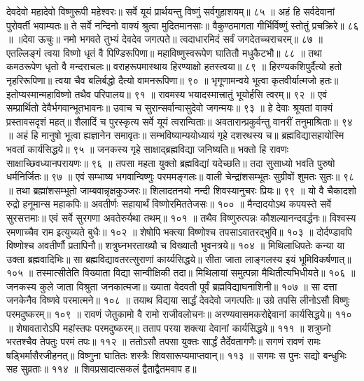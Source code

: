 देवदेवो महादेवो विष्णुरूपी महेश्वरः॥
सर्वे यूयं प्रार्थयन्तु विष्णुं सर्वगुहाशयम्॥ ८५ ॥
अहं हि सर्वदेवानां पुरोवर्ती भवाम्यतः॥
ते सर्वे नन्दिनो वाक्यं श्रुत्वा मुदितमानसाः॥
वैकुण्ठमागता गीर्भिर्विष्णुं स्तोतुं प्रचक्रिरे॥ ८६ ॥
॥देवा ऊचुः॥
नमो भगवते तुभ्यं देवदेव जगत्पते॥
त्वदाधारमिदं सर्वं जगदेतच्चराचरम्॥ ८७ ॥
एतल्लिङ्गं त्वया विष्णो धृतं वै पिण्डिरूपिणा॥
महाविष्णुस्वरूपेण घातितौ मधुकैटभौ॥ ८८ ॥
तथा कमठरूपेण धृतो वै मन्दराचलः॥
वराहरूपमास्थाय हिरण्याक्षो हतस्त्वया॥ ८९ ॥
हिरण्यकशिपुर्दैत्यो हतो नृहरिरूपिणा॥
त्वया चैव बलिर्बद्धो दैत्यो वामनरूपिणा॥ ९० ॥
भृगूणामन्वये भूत्वा कृतवीर्यात्मजो हतः॥
इतोप्यस्मान्महाविष्णो तथैव परिपालय॥ ९१ ॥
रावमस्य भयादस्मात्त्रातुं भूयोर्हसि त्वरम्॥ ९२ ॥
एवं सम्प्रार्थितो देवैर्भगवान्भूतभावनः॥
उवाच च सुरान्सर्वान्वासुदेवो जगन्मयः॥ ९३ ॥
हे देवाः श्रूयतां वाक्यं प्रस्तावसदृशं महत्॥
शैलादिं च पुरस्कृत्य सर्वे यूयं त्वरान्विताः॥
अवतारान्प्रकुर्वन्तु वानरीं तनुमाश्रिताः॥ ९४ ॥
अहं हि मानुषो भूत्वा ह्यज्ञानेन समावृतः॥
सम्भविष्याम्ययोध्यायं गृहे दशरथस्य च॥
ब्रह्मविद्यासहायोस्मि भवतां कार्यसिद्धये॥ ९५ ॥
जनकस्य गृहे साक्षाद्ब्रह्मविद्या जनिष्यति॥
भक्तो हि रावणः साक्षाच्छिवध्यानपरायणः॥ ९६ ॥
तपसा महता युक्तो ब्रह्मविद्यां यदेच्छति॥
तदा सुसाध्यो भवति पुरुषो धर्मनिर्जितः॥ ९७ ॥
एवं सम्भाष्य भगवान्विष्णुः परममङ्गलः॥
वाली चेन्द्रांशसम्भूतः सुग्रीवों शुमतः सुतः॥ ९८ ॥
तथा ब्रह्मांशसम्भूतो जाम्बवान्नृक्षकुञ्जरः॥
शिलादतनयो नन्दी शिवस्यानुचरः प्रियः॥ ९९ ॥
यो वै चैकादशो रुद्रो हनूमान्स महाकपिः॥
अवतीर्णः सहायार्थं विष्णोरमिततेजसः॥ १०० ॥
मैन्दादयोऽथ कपयस्ते सर्वे सुरसत्तमाः॥
एवं सर्वे सुरगणा अवतेरुर्यथा तथम्॥ १०१ ॥
तथैव विष्णुरुत्पन्नः कौशल्यानन्दवर्द्धनः॥
विश्वस्य रमणाच्चैव राम इत्युच्यते बुधैः॥ १०२ ॥
शेषोपि भक्त्या विष्णोश्च तपसाऽवातरद्भुवि॥ १०३ ॥
दोर्दण्डावपि विष्णोश्च अवतीर्णौ प्रतापिनौ॥
शत्रुघ्नभरताख्यौ च विख्यातौ भुवनत्रये॥ १०४ ॥
मिथिलाधिपतेः कन्या या उक्ता ब्रह्मवादिभिः॥
सा ब्रह्मविद्यावतरत्सुराणां कार्य्यसिद्धये॥
सीता जाता लाङ्गलस्य इयं भूमिविकर्षणात्॥ १०५ ॥
तस्मात्सीतेति विख्याता विद्या सान्वीक्षिकी तदा॥
मिथिलायां समुत्पन्ना मैथितीत्यभिधीयते॥ १०६ ॥
जनकस्य कुले जाता विश्रुता जनकात्मजा॥
ख्याता वेदवती पूर्वं ब्रह्मविद्याघनाशिनी॥ १०७ ॥
सा दत्ता जनकेनैव विष्णवे परमात्मने॥ १०८ ॥
तयाथ विद्यया सार्द्धं देवदेवो जगत्पतिः॥
उग्रे तपसि लीनोऽसौ विष्णुः परमदुष्करम्॥ १०९ ॥
रावणं जेतुकामो वै रामो राजीवलोचनः॥
अरण्यवासमकरोद्देवानां कार्यसिद्धये॥ ११० ॥
शेषावतारोऽपि महांस्तपः परमदुष्करम्॥
तताप परया शक्त्या देवानां कार्यसिद्धये॥ १११ ॥
शत्रुघ्नो भरतश्चैव तेपतुः परमं तपः॥ ११२ ॥
ततोऽसौ तपसा युक्तः सार्द्धं तैर्देवतागणैः॥
सगणं रावणं रामः षड्भिर्मासैरजीहनत्॥
विष्णुना घातितः शस्त्रैः शिवसारूप्यमाप्तवान्॥ ११३ ॥
सगमः स पुनः सद्यो बन्धुभिः सह सुव्रताः॥ ११४ ॥
शिवप्रसादात्सकलं द्वैताद्वैतमवाप ह॥
